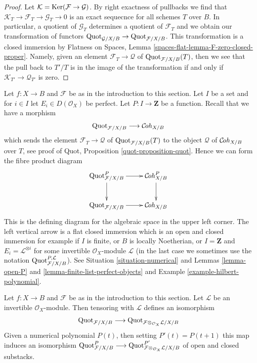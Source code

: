 \begin{proof}
Let $\mathcal{K} = \mathop{\mathrm{Ker}}(\mathcal{F} \to \mathcal{G})$. By right
exactness of pullbacks we find that
$\mathcal{K}_T \to \mathcal{F}_T \to \mathcal{G}_T \to 0$
is an exact sequecnce for all schemes $T$ over $B$.
In particular, a quotient of $\mathcal{G}_T$
determines a quotient of $\mathcal{F}_T$ and we obtain our transformation
of functors
$\mathrm{Quot}_{\mathcal{G}/X/B} \to \mathrm{Quot}_{\mathcal{F}/X/B}$.
This transformation is a closed immersion by
Flatness on Spaces, Lemma \ref{spaces-flat-lemma-F-zero-closed-proper}.
Namely, given an element $\mathcal{F}_T \to \mathcal{Q}$ of
$\mathrm{Quot}_{\mathcal{F}/X/B}(T)$, then we see that the pull
back to $T'/T$ is in the image of the transformation if and
only if $\mathcal{K}_{T'} \to \mathcal{Q}_{T'}$ is zero.
\end{proof}

\begin{remark}
\label{remark-quot-numerical}
Let $f : X \to B$ and $\mathcal{F}$ be as in the introduction to this section.
Let $I$ be a set and for $i \in I$ let $E_i \in D(\mathcal{O}_X)$ be perfect.
Let $P : I \to \mathbf{Z}$ be a function. Recall that we have a morphism
$$
\mathrm{Quot}_{\mathcal{F}/X/B} \longrightarrow \mathcal{C}\!\mathit{oh}_{X/B}
$$
which sends the element $\mathcal{F}_T \to \mathcal{Q}$
of $\mathrm{Quot}_{\mathcal{F}/X/B}(T)$ to the object $\mathcal{Q}$
of $\mathcal{C}\!\mathit{oh}_{X/B}$ over $T$, see proof of
Quot, Proposition \ref{quot-proposition-quot}. Hence we can form
the fibre product diagram
$$
\xymatrix{
\Quotfunctor^P_{\mathcal{F}/X/B} \ar[r] \ar[d] &
\Cohstack^P_{X/B} \ar[d] \\
\Quotfunctor_{\mathcal{F}/X/B} \ar[r] &
\Cohstack_{X/B}
}
$$
This is the defining diagram for the algebraic space in the
upper left corner. The left vertical arrow is a
flat closed immersion which is an open and closed immersion
for example if $I$ is finite, or $B$ is locally Noetherian, or
$I = \mathbf{Z}$ and $E_i = \mathcal{L}^{\otimes i}$ for some
invertible $\mathcal{O}_X$-module $\mathcal{L}$ (in the last
case we sometimes use the notation
$\mathrm{Quot}^{P, \mathcal{L}}_{\mathcal{F}/X/B}$).
See Situation \ref{situation-numerical} and
Lemmas \ref{lemma-open-P} and \ref{lemma-finite-list-perfect-objects} and
Example \ref{example-hilbert-polynomial}.
\end{remark}

\begin{lemma}
\label{lemma-quot-tensor-invertible}
Let $f : X \to B$ and $\mathcal{F}$ be as in the introduction to this section.
Let $\mathcal{L}$ be an invertible $\mathcal{O}_X$-module.
Then tensoring with $\mathcal{L}$ defines an isomorphism
$$
\mathrm{Quot}_{\mathcal{F}/X/B}
\longrightarrow
\mathrm{Quot}_{\mathcal{F} \otimes_{\mathcal{O}_X} \mathcal{L}/X/B}
$$
Given a numerical polynomial $P(t)$, then setting $P'(t) = P(t + 1)$
this map induces an isomorphism
$\mathrm{Quot}^P_{\mathcal{F}/X/B}
\longrightarrow
\mathrm{Quot}^{P'}_{\mathcal{F} \otimes_{\mathcal{O}_X} \mathcal{L}/X/B}$
of open and closed substacks.
\end{lemma}

